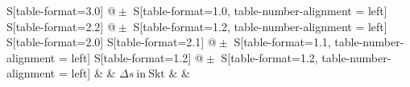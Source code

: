 \begin{table}[h!]
    \centering
    \caption{Natrium ($n=3,z=11$) -- Abschirmungszahl für jedes betrachtete Dublett, sowie bei der Berechnung verwendete Größen}
    \label{tab:Natrium}
    \begin{tabular}{
	S[table-format=3.0]
	@{${}\pm{}$}
	S[table-format=1.0, table-number-alignment = left]
	S[table-format=2.2]
	@{${}\pm{}$}
	S[table-format=1.2, table-number-alignment = left]
	S[table-format=2.0]
	S[table-format=2.1]
	@{${}\pm{}$}
	S[table-format=1.1, table-number-alignment = left]
	S[table-format=1.2]
	@{${}\pm{}$}
	S[table-format=1.2, table-number-alignment = left]
	}
	\toprule
			& 		& 
	{$\Delta s \ \mathrm{in} \ \mathrm{Skt}$}		& 		& 
			\\ 
	\midrule
    
    \bottomrule
    \end{tabular}
    \end{table}

